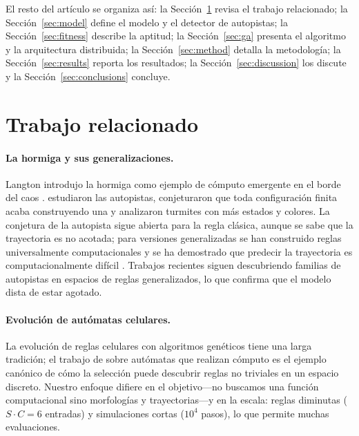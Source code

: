 \documentclass[11pt,a4paper]{article}
\begin{document}
El resto del art\'iculo se organiza as\'i: la Secci\'on~\ref{sec:related} revisa
el trabajo relacionado; la Secci\'on~\ref{sec:model} define el modelo y el
detector de autopistas; la Secci\'on~\ref{sec:fitness} describe la aptitud; la
Secci\'on~\ref{sec:ga} presenta el algoritmo y la arquitectura distribuida; la
Secci\'on~\ref{sec:method} detalla la metodolog\'ia; la
Secci\'on~\ref{sec:results} reporta los resultados; la
Secci\'on~\ref{sec:discussion} los discute y la
Secci\'on~\ref{sec:conclusions} concluye.

\section{Trabajo relacionado}\label{sec:related}

\paragraph{La hormiga y sus generalizaciones.}
Langton introdujo la hormiga como ejemplo de c\'omputo emergente en el borde
del caos \citep{langton1986,langton1990}.  \citet{gale1995} estudiaron las
autopistas, conjeturaron que toda configuraci\'on finita acaba construyendo una
y analizaron turmites con m\'as estados y colores.  La conjetura de la autopista
sigue abierta para la regla cl\'asica, aunque se sabe que la trayectoria es no
acotada; para versiones generalizadas se han construido reglas universalmente
computacionales y se ha demostrado que predecir la trayectoria es
computacionalmente dif\'icil \citep{gajardo2002}.  Trabajos recientes siguen
descubriendo familias de autopistas en espacios de reglas generalizados, lo que
confirma que el modelo dista de estar agotado.

\paragraph{Evoluci\'on de aut\'omatas celulares.}
La evoluci\'on de reglas celulares con algoritmos gen\'eticos tiene una larga
tradici\'on; el trabajo de \citet{mitchell1993} sobre aut\'omatas que realizan
c\'omputo es el ejemplo can\'onico de c\'omo la selecci\'on puede descubrir
reglas no triviales en un espacio discreto.  Nuestro enfoque difiere en el
objetivo---no buscamos una funci\'on computacional sino morfolog\'ias y
trayectorias---y en la escala: reglas diminutas ($S\!\cdot\!C=6$ entradas) y
simulaciones cortas ($10^{4}$ pasos), lo que permite muchas evaluaciones.
\end{document}
